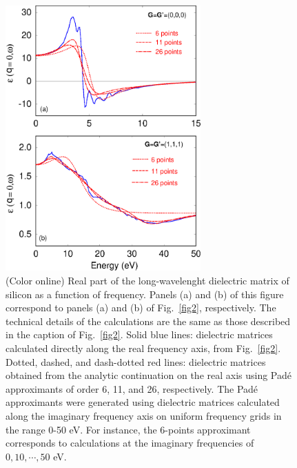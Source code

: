 \documentclass[twocolumn,prb,showpacs,superscriptaddress]{revtex4}
\begin{document}
\begin  {figure}
\begin  {center}
\includegraphics[width=7.5cm]{fig3.eps}
\end    {center}
\caption{\label{fig3}
        (Color online)
        Real part of the long-wavelenght dielectric matrix of silicon as a function of frequency. 
        Panels (a) and (b) of this figure correspond to panels (a) and (b) of Fig.~\ref{fig2}, respectively. The 
        technical details of the calculations are the same as those described in the caption of Fig.\ \ref{fig2}.
        Solid blue lines: dielectric matrices calculated directly along the real frequency axis,
        from  Fig.\ \ref{fig2}. Dotted, dashed, and dash-dotted red lines: dielectric matrices
        obtained from the analytic continuation on the real axis using Pad\'e approximants of order
        6, 11, and 26, respectively. The Pad\'e approximants were generated using dielectric
        matrices calculated along the imaginary frequency axis on uniform frequency grids
        in the range 0-50 eV. For instance, the 6-points approximant corresponds to calculations
        at the imaginary frequencies of $0,10,\cdots,50$ eV.
        }
\end    {figure}
\end{document}
